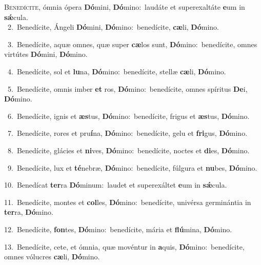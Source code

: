 \lettrine{\initial\textcolor{\initialcolor}{B}}{enedícite,} ómnia ópera \textbf{Dó}\-mini, \textbf{Dó}\-mino:~\star laudáte et superexaltáte \textbf{e}\-um in \textbf{sǽ}\-cula.\\
{\numbfont\textcolor{\numbcolor}{~2.}}~Benedícite, Ángeli \textbf{Dó}\-mini, \textbf{Dó}\-mino:~\star benedícite, \textbf{cæ}\-li, \textbf{Dó}\-mino.\par
{\numbfont\textcolor{\numbcolor}{~3.}}~Benedícite, aquæ omnes, quæ super \textbf{cæ}\-los sunt, \textbf{Dó}\-mino:~\star benedícite, omnes virtútes \textbf{Dó}\-mini, \textbf{Dó}\-mino.\par
{\numbfont\textcolor{\numbcolor}{~4.}}~Benedícite, sol et \textbf{lu}\-na, \textbf{Dó}\-mino:~\star benedícite, stellæ \textbf{cæ}\-li, \textbf{Dó}\-mino.\par
{\numbfont\textcolor{\numbcolor}{~5.}}~Benedícite, omnis imber \textbf{et} ros, \textbf{Dó}\-mino:~\star benedícite, omnes spíritus \textbf{De}\-i, \textbf{Dó}\-mino.\par
{\numbfont\textcolor{\numbcolor}{~6.}}~Benedícite, ignis et \textbf{æs}\-tus, \textbf{Dó}\-mino:~\star benedícite, frigus et \textbf{æs}\-tus, \textbf{Dó}\-mino.\par
{\numbfont\textcolor{\numbcolor}{~7.}}~Benedícite, rores et pru\-\textbf{í}\-na, \textbf{Dó}\-mino:~\star benedícite, gelu et \textbf{fri}\-gus, \textbf{Dó}\-mino.\par
{\numbfont\textcolor{\numbcolor}{~8.}}~Benedícite, glácies et \textbf{ni}\-ves, \textbf{Dó}\-mino:~\star benedícite, noctes et \textbf{di}\-es, \textbf{Dó}\-mino.\par
{\numbfont\textcolor{\numbcolor}{~9.}}~Benedícite, lux et \textbf{té}\-nebræ, \textbf{Dó}\-mino:~\star benedícite, fúlgura et \textbf{nu}\-bes, \textbf{Dó}\-mino.\par
{\numbfont\textcolor{\numbcolor}{10.}}~Benedícat \textbf{ter}\-ra \textbf{Dó}\-minum:~\star laudet et superexáltet \textbf{e}\-um in \textbf{sǽ}\-cula.\par
{\numbfont\textcolor{\numbcolor}{11.}}~Benedícite, montes et \textbf{col}\-les, \textbf{Dó}\-mino:~\star benedícite, univérsa germinántia in \textbf{ter}\-ra, \textbf{Dó}\-mino.\par
{\numbfont\textcolor{\numbcolor}{12.}}~Benedícite, \textbf{fon}\-tes, \textbf{Dó}\-mino:~\star benedícite, mária et \textbf{flú}\-mina, \textbf{Dó}\-mino.\par
{\numbfont\textcolor{\numbcolor}{13.}}~Benedícite, cete, et ómnia, quæ movéntur in \textbf{a}\-quis, \textbf{Dó}\-mino:~\star benedícite, omnes vólucres \textbf{cæ}\-li, \textbf{Dó}\-mino.\par
